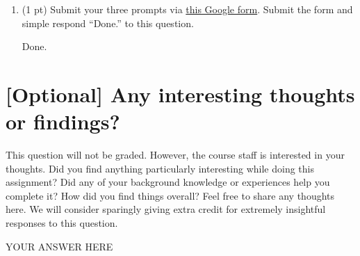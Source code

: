 \documentclass{article}
\begin{document}
\begin{enumerate}[label=(\alph*)]
\begin{mdframed}
    \end{mdframed}

    \item (1 pt) Submit your three prompts via \href{https://forms.gle/t2Vy9Ch1JM5bNoch8}{this Google form}. Submit the form and simple respond ``Done.'' to this question. 

    \bigskip

    \begin{mdframed}
        Done.
    \end{mdframed}
        
\end{enumerate}







\newpage

\section*{[Optional] Any interesting thoughts or findings?}

This question will not be graded. However, the course staff is interested in your thoughts. Did you find anything particularly interesting while doing this assignment? Did any of your background knowledge or experiences help you complete it? How did you find things overall? Feel free to share any thoughts here. We will consider sparingly giving extra credit for extremely insightful responses to this question.

\bigskip

\begin{mdframed}
        YOUR ANSWER HERE
\end{mdframed}

\newpage


\end{document}
